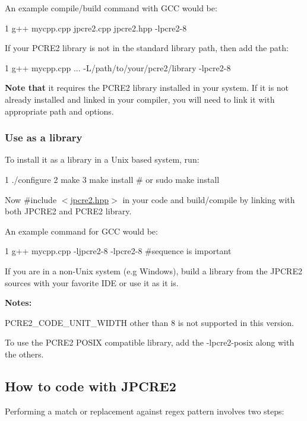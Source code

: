 An example compile/build command with G\+CC would be\+:


\begin{DoxyCode}
1 g++ mycpp.cpp jpcre2.cpp jpcre2.hpp -lpcre2-8
\end{DoxyCode}


If your P\+C\+R\+E2 library is not in the standard library path, then add the path\+:


\begin{DoxyCode}
1 g++ mycpp.cpp ... -L/path/to/your/pcre2/library -lpcre2-8
\end{DoxyCode}


{\bfseries Note that} it requires the P\+C\+R\+E2 library installed in your system. If it is not already installed and linked in your compiler, you will need to link it with appropriate path and options.\hypertarget{index_install-as-a-library}{}\subsubsection{Use as a library}\label{index_install-as-a-library}
To install it as a library in a Unix based system, run\+:


\begin{DoxyCode}
1 ./configure
2 make
3 make install # or sudo make install
\end{DoxyCode}
 Now {\ttfamily \#include $<$\hyperlink{jpcre2_8hpp}{jpcre2.\+hpp}$>$} in your code and build/compile by linking with both J\+P\+C\+R\+E2 and P\+C\+R\+E2 library.

An example command for G\+CC would be\+:


\begin{DoxyCode}
1 g++  mycpp.cpp -ljpcre2-8 -lpcre2-8 #sequence is important
\end{DoxyCode}


If you are in a non-\/\+Unix system (e.\+g Windows), build a library from the J\+P\+C\+R\+E2 sources with your favorite I\+DE or use it as it is.

{\bfseries Notes\+:}


\begin{DoxyEnumerate}
\item {\ttfamily P\+C\+R\+E2\+\_\+\+C\+O\+D\+E\+\_\+\+U\+N\+I\+T\+\_\+\+W\+I\+D\+TH} other than 8 is not supported in this version.
\item To use the {\ttfamily P\+C\+R\+E2 P\+O\+S\+IX} compatible library, add the {\ttfamily -\/lpcre2-\/posix} along with the others.
\end{DoxyEnumerate}\hypertarget{index_how-to-code-with-jpcre2}{}\subsection{How to code with J\+P\+C\+R\+E2}\label{index_how-to-code-with-jpcre2}
Performing a match or replacement against regex pattern involves two steps\+:


